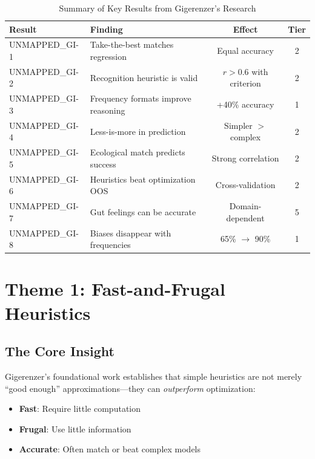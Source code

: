 \begin{table}[htbp]
\centering
\caption{Summary of Key Results from Gigerenzer's Research}
\label{tab:gi-key-results}
\renewcommand{\arraystretch}{1.3}
\begin{tabular}{@{}llcc@{}}
\toprule
\textbf{Result} & \textbf{Finding} & \textbf{Effect} & \textbf{Tier} \\
\midrule
UNMAPPED_GI-1 & Take-the-best matches regression & Equal accuracy & 2 \\
UNMAPPED_GI-2 & Recognition heuristic is valid & $r > 0.6$ with criterion & 2 \\
UNMAPPED_GI-3 & Frequency formats improve reasoning & +40\% accuracy & 1 \\
UNMAPPED_GI-4 & Less-is-more in prediction & Simpler $>$ complex & 2 \\
UNMAPPED_GI-5 & Ecological match predicts success & Strong correlation & 2 \\
UNMAPPED_GI-6 & Heuristics beat optimization OOS & Cross-validation & 2 \\
UNMAPPED_GI-7 & Gut feelings can be accurate & Domain-dependent & 5 \\
UNMAPPED_GI-8 & Biases disappear with frequencies & 65\% $\to$ 90\% & 1 \\
\bottomrule
\end{tabular}
\end{table}


\section{Theme 1: Fast-and-Frugal Heuristics}
\label{sec:gi-heuristics}

\subsection{The Core Insight}

Gigerenzer's foundational work \citep{gigerenzer1999simple} establishes that simple heuristics are not merely ``good enough'' approximations---they can \textit{outperform} optimization:

\begin{itemize}[nosep]
\item \textbf{Fast}: Require little computation
\item \textbf{Frugal}: Use little information
\item \textbf{Accurate}: Often match or beat complex models
\end{itemize}

